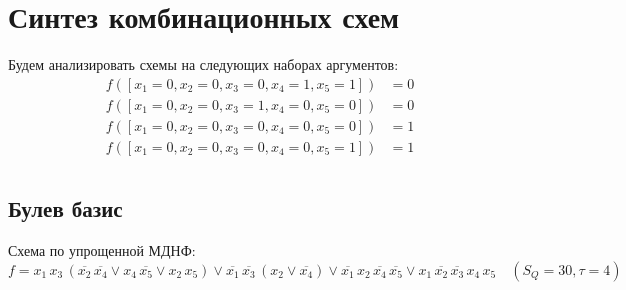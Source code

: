\documentclass{article}
\begin{document}
\section*{Синтез комбинационных схем}
Будем анализировать схемы на следующих наборах аргументов:
\begin{align*}
    f([x_1 = 0, x_2 = 0, x_3 = 0, x_4 = 1, x_5 = 1]) &= 0 \\
    f([x_1 = 0, x_2 = 0, x_3 = 1, x_4 = 0, x_5 = 0]) &= 0 \\
    f([x_1 = 0, x_2 = 0, x_3 = 0, x_4 = 0, x_5 = 0]) &= 1 \\
    f([x_1 = 0, x_2 = 0, x_3 = 0, x_4 = 0, x_5 = 1]) &= 1 \\
\end{align*}
\newpage
\subsection*{Булев базис}
Схема по упрощенной МДНФ:
\[f = x_{1} \, x_{3} \, \left(\overline{x_{2}} \, \overline{x_{4}} \lor x_{4} \, \overline{x_{5}} \lor x_{2} \, x_{5}\right) \lor \overline{x_{1}} \, \overline{x_{3}} \, \left(x_{2} \lor \overline{x_{4}}\right) \lor \overline{x_{1}} \, x_{2} \, \overline{x_{4}} \, \overline{x_{5}} \lor x_{1} \, \overline{x_{2}} \, \overline{x_{3}} \, x_{4} \, x_{5}\quad(S_Q = 30, \tau = 4)\]
\end{document}
